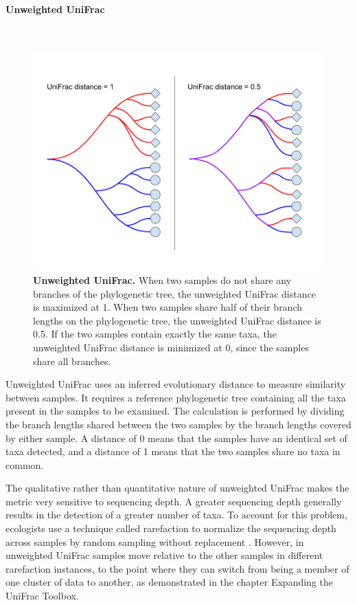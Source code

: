 \paragraph{Unweighted UniFrac}\mbox{}\\

\begin{figure}[h]
\begin{center}
\includegraphics[width=\textwidth]{unifrac.png}
\caption[Unweighted UniFrac.]{\textbf{Unweighted UniFrac.} When two samples do not share any branches of the phylogenetic tree, the unweighted UniFrac distance is maximized at 1. When two samples share half of their branch lengths on the phylogenetic tree, the unweighted UniFrac distance is 0.5. If the two samples contain exactly the same taxa, the unweighted UniFrac distance is minimized at 0, since the samples share all branches.}
\end{center}
\end{figure}

Unweighted UniFrac uses an inferred evolutionary distance to measure similarity between samples. It requires a reference phylogenetic tree containing all the taxa present in the samples to be examined. The calculation is performed by dividing the branch lengths shared between the two samples by the branch lengths covered by either sample. A distance of 0 means that the samples have an identical set of taxa detected, and a distance of 1 means that the two samples share no taxa in common.

The qualitative rather than quantitative nature of unweighted UniFrac makes the metric very sensitive to sequencing depth. A greater sequencing depth generally results in the detection of a greater number of taxa. To account for this problem, ecologists use a technique called rarefaction to normalize the sequencing depth across samples by random sampling without replacement \cite{de2011evaluation}. However, in unweighted UniFrac samples move relative to the other samples in different rarefaction instances, to the point where they can switch from being a member of one cluster of data to another, as demonstrated in the chapter Expanding the UniFrac Toolbox.

